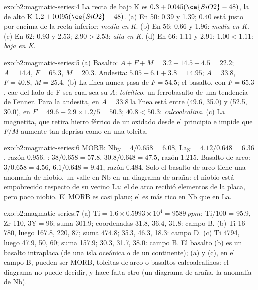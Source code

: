 \begin{solution}{exo:b2:magmatic-series:4}
La recta de bajo K es $0.3 + 0.045(\ce{SiO2} - 48)$, la de alto K $1.2 +
0.095(\ce{SiO2} - 48)$. (a) En 50: 0.39 y 1.39; $0.40$ está justo por encima de la recta inferior:
\emph{media en K}. (b) En 56: 0.66 y 1.96: \emph{media en K}. (c) En 62: 0.93 y 2.53;
$2.90 > 2.53$: \emph{alta en K}. (d) En 66: 1.11 y 2.91; $1.00 < 1.11$: \emph{baja en K}.
\end{solution}

\begin{solution}{exo:b2:magmatic-series:5}
(a) Basalto: $A + F + M = 3.2 + 14.5 + 4.5 = 22.2$; $A = 14.4$, $F = 65.3$, $M = 20.3$.
Andesita: $5.05 + 6.1 + 3.8 = 14.95$; $A = 33.8$, $F = 40.8$, $M = 25.4$. (b) La línea
nunca pasa de $F = 54.5$; el basalto, con $F = 65.3$, cae del lado de F
sea cual sea su $A$: \emph{toleítico}, un ferrobasalto de una tendencia de Fenner. Para la
andesita, en $A = 33.8$ la línea está entre (49.6, 35.0) y (52.5, 30.0), en $F =
49.6 + 2.9\times1.2/5 = 50.3$; $40.8 < 50.3$: \emph{calcoalcalina}. (c) La magnetita,
que retira hierro férrico de un  oxidado desde el principio e impide que $F/M$
aumente tan deprisa como en una toleita.
\end{solution}

\begin{solution}{exo:b2:magmatic-series:6}
MORB: $\mathrm{Nb_N} = 4/0.658 = 6.08$, $\mathrm{La_N} = 4.12/0.648 = 6.36$, razón
0.956. : $38/0.658 = 57.8$, $30.8/0.648 = 47.5$, razón 1.215. Basalto
de arco: $3/0.658 = 4.56$, $6.1/0.648 = 9.41$, razón 0.484. Solo el basalto de arco tiene una
anomalía de niobio, un valle en Nb en un diagrama de araña: el niobio está empobrecido respecto de
su vecino La: el  de arco recibió elementos de la placa, pero poco
niobio. El MORB es casi plano; el  es más rico
en Nb que en La.
\end{solution}

\begin{solution}{exo:b2:magmatic-series:7}
(a) $\mathrm{Ti} = 1.6\times0.5993\times10^4 = \qty{9589}{ppm}$; Ti/100 = 95.9, Zr
110, $3\mathrm Y = 96$; suma 301.9; coordenadas 31.8, 36.4, 31.8: campo B. (b) Ti
16\,780, luego 167.8, 220, 87; suma 474.8; 35.3, 46.3, 18.3: campo D. (c) Ti 4794, luego
47.9, 50, 60; suma 157.9; 30.3, 31.7, 38.0: campo B. El basalto (b) es un basalto intraplaca
(de una isla oceánica o de un continente); (a) y (c), en el campo B, pueden ser MORB, toleitas
de arco o basaltos calcoalcalinos: el diagrama no puede decidir, y hace falta otro (un
diagrama de araña, la anomalía de Nb).
\end{solution}


